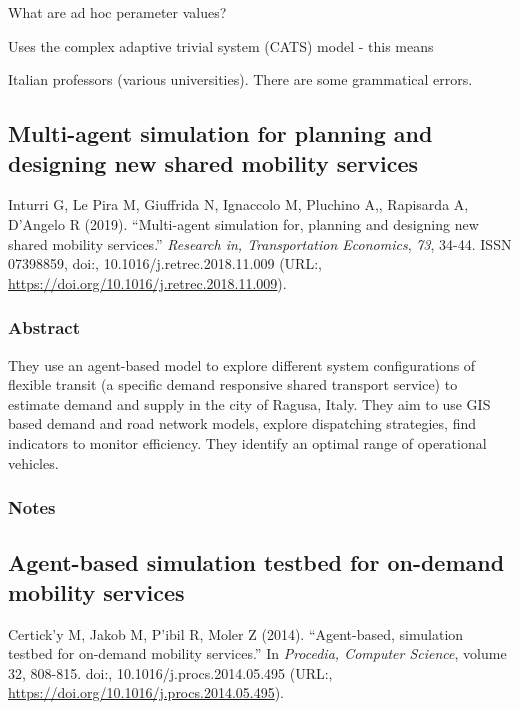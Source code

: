 \documentclass[]{article}
\begin{document}
What are ad hoc perameter values?

Uses the complex adaptive trivial system (CATS) model - this means

Italian professors (various universities). There are some grammatical
errors.

\hypertarget{multi-agent-simulation-for-planning-and-designing-new-shared-mobility-services}{%
\subsection{Multi-agent simulation for planning and designing new shared
mobility
services}\label{multi-agent-simulation-for-planning-and-designing-new-shared-mobility-services}}

Inturri G, Le Pira M, Giuffrida N, Ignaccolo M, Pluchino A,, Rapisarda
A, D'Angelo R (2019). ``Multi-agent simulation for, planning and
designing new shared mobility services.'' \emph{Research in,
Transportation Economics}, \emph{73}, 34-44. ISSN 07398859, doi:,
10.1016/j.retrec.2018.11.009 (URL:,
\url{https://doi.org/10.1016/j.retrec.2018.11.009}).

\hypertarget{abstract-12}{%
\subsubsection{Abstract}\label{abstract-12}}

They use an agent-based model to explore different system configurations
of flexible transit (a specific demand responsive shared transport
service) to estimate demand and supply in the city of Ragusa, Italy.
They aim to use GIS based demand and road network models, explore
dispatching strategies, find indicators to monitor efficiency. They
identify an optimal range of operational vehicles.

\hypertarget{notes-12}{%
\subsubsection{Notes}\label{notes-12}}

\hypertarget{agent-based-simulation-testbed-for-on-demand-mobility-services}{%
\subsection{Agent-based simulation testbed for on-demand mobility
services}\label{agent-based-simulation-testbed-for-on-demand-mobility-services}}

Certick'y M, Jakob M, P'ibil R, Moler Z (2014). ``Agent-based,
simulation testbed for on-demand mobility services.'' In \emph{Procedia,
Computer Science}, volume 32, 808-815. doi:, 10.1016/j.procs.2014.05.495
(URL:, \url{https://doi.org/10.1016/j.procs.2014.05.495}).
\end{document}
